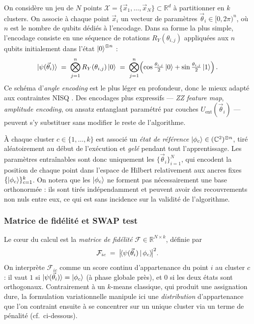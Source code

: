 \documentclass[a4paper]{article}
\begin{document}
On considère un jeu de $N$ points $\mathcal{X} = \{\vec{x}_1,\dots,\vec{x}_N\} \subset \mathbb{R}^d$ à partitionner en $k$ clusters. On associe à chaque point $\vec{x}_i$ un vecteur de paramètres $\vec{\theta}_i \in [0, 2\pi)^{n}$, où $n$ est le nombre de qubits dédiés à l'encodage. Dans sa forme la plus simple, l'encodage consiste en une séquence de rotations $R_Y(\theta_{i,j})$ appliquées aux $n$ qubits initialement dans l'état $\ket{0}^{\otimes n}$ :
\[
\ket{\psi(\vec{\theta}_i)} \;=\; \bigotimes_{j=1}^{n} R_Y(\theta_{i,j})\ket{0}
\;=\; \bigotimes_{j=1}^{n}\!\left(\cos\tfrac{\theta_{i,j}}{2}\ket{0} + \sin\tfrac{\theta_{i,j}}{2}\ket{1}\right).
\]
Ce schéma d'\emph{angle encoding} est le plus léger en profondeur, donc le mieux adapté aux contraintes NISQ \cite{abbou2025vqc}. Des encodages plus expressifs — \emph{ZZ feature map}, \emph{amplitude encoding}, ou ansatz entanglant paramétré par couches $U_{\text{ent}}(\vec{\theta}_i)$ — peuvent s'y substituer sans modifier le reste de l'algorithme.

À chaque cluster $c \in \{1,\dots,k\}$ est associé un \emph{état de référence} $\ket{\phi_c} \in (\mathbb{C}^2)^{\otimes n}$, tiré aléatoirement au début de l'exécution et \emph{gelé} pendant tout l'apprentissage. Les paramètres entraînables sont donc uniquement les $\{\vec{\theta}_i\}_{i=1}^N$, qui encodent la position de chaque point dans l'espace de Hilbert relativement aux ancres fixes $\{\ket{\phi_c}\}_{c=1}^k$. On notera que les $\ket{\phi_c}$ ne forment pas nécessairement une base orthonormée : ils sont tirés indépendamment et peuvent avoir des recouvrements non nuls entre eux, ce qui est sans incidence sur la validité de l'algorithme.

\subsubsection*{Matrice de fidélité et SWAP test}

Le cœur du calcul est la \emph{matrice de fidélité} $\mathcal{F} \in \mathbb{R}^{N\times k}$, définie par
\[
\mathcal{F}_{ic} \;=\; \bigl|\!\braket{\psi(\vec{\theta}_i)\,|\,\phi_c}\!\bigr|^2.
\]
On interprète $\mathcal{F}_{ic}$ comme un score continu d'appartenance du point $i$ au cluster $c$ : il vaut $1$ si $\ket{\psi(\vec{\theta}_i)} = \ket{\phi_c}$ (à phase globale près), et $0$ si les deux états sont orthogonaux. Contrairement à un $k$-means classique, qui produit une assignation dure, la formulation variationnelle manipule ici une \emph{distribution} d'appartenance que l'on contraint ensuite à se concentrer sur un unique cluster via un terme de pénalité (cf.~ci-dessous).
\end{document}

